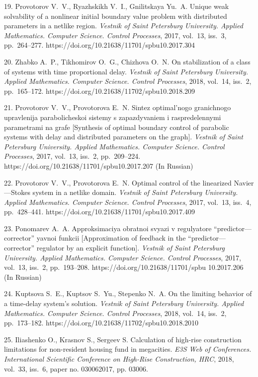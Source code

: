 {19. Provotorov V.~V.,  Ryazhskikh V.~I., Gnilitskaya Yu.~A. Unique
weak solvability of a nonlinear initial boundary value problem
with distributed parameters in a netlike region. \textit{Vestnik
of Saint Petersburg University. Applied Mathematics. Computer
Science. Control Processes}, 2017, vol.~13, iss.~3, pp.~264--277.
https://doi.org/10.21638/11701/spbu10.2017.304

20. Zhabko A.~P., Tikhomirov O.~G., Chizhova O.~N. On
stabilization of a class of systems with time proportional delay.
\textit{Vestnik of Saint Petersburg University. Applied
Mathematics. Computer Science. Control Processes}, 2018, vol.~14,
iss.~2, pp.~165--172.
https://doi.org/10.21638/11702/spbu10.2018.209

21. Provotorov V.~V., Provotorova E.~N. Sintez optimal'nogo
granichnogo upravlenija parabolicheskoi sistemy s zapazdyvaniem i
raspredelennymi parametrami na grafe [Synthesis of optimal
boundary control of parabolic systems with delay and distributed
parameters on the graph]. \textit{Vestnik of Saint Petersburg
University. Applied Mathematics. Computer Science. Control
Processes}, 2017, vol.~13, iss.~2, pp.~209--224.
https://doi.org/10.21638/11701/spbu10.2017.207 (In Russian)

22. Provotorov V.~V., Provotorova E.~N.  Optimal control of the
linearized Navier---Stokes system in a netlike domain.
\textit{Vestnik of Saint Petersburg University. Applied
Mathematics. Computer Science. Control Processes}, 2017, vol.~13,
iss.~4, pp.~428--441.
https://doi.org/10.21638/11701/spbu10.2017.409

23. Ponomarev A.~A. Approksimaciya obratnoi svyazi v regulyatore
``predictor---corrector'' yavnoi funkcii [Approximation of
feedback in the ``predictor---corrector'' regulator by an explicit
function]. \textit{Vestnik of Saint Petersburg University. Applied
Mathematics. Computer Science. Control Processes}, 2017, vol.~13,
iss.~2, pp.~193--208. https://doi.org/10.21638/11701/spbu
10.2017.206  (In Russian)

24. Kuptsova S.~E., Kuptsov S.~Yu., Stepenko N.~A. On the limiting
behavior of a time-delay system's solution. \textit{Vestnik of
Saint Petersburg University. Applied Mathematics. Computer
Science. Control Processes}, 2018, vol.~14, iss.~2, pp.~173--182.
https://doi.org/10.21638/11702/spbu10.2018.2010

25. Iliashenko O., Krasnov S., Sergeev S. Calculation of high-rise
construction limitations for non-resident housing fund in
megacities. \emph{E3S Web of Conferences.  International
Scientific Conference on High-Rise Construction, HRC}, 2018,
vol.~33, iss.~6, paper no. 030062017, pp. 03006.

}
